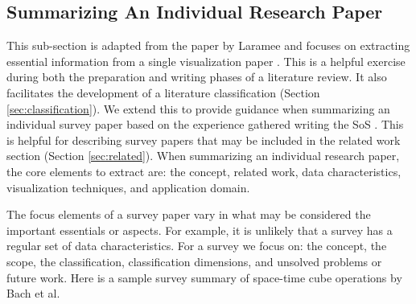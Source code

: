 \subsection{Summarizing An Individual Research Paper} \label{sec:summary}
This sub-section is adapted from the paper by Laramee and focuses on extracting essential information from a single visualization paper \cite{laramee2011read}. This is a helpful exercise during both the preparation and writing phases of a literature review. It also facilitates the development of a literature classification (Section \ref{sec:classification}). We extend this to provide guidance when summarizing an individual survey paper based on the experience gathered writing the SoS \cite{mcnabb2017sos}. This is helpful for describing survey papers  that may be included in the related work section (Section \ref{sec:related}). When summarizing an individual research paper, the core elements to extract are: the concept, related work, data characteristics, visualization techniques, and application domain. 

The focus elements of a survey paper vary in what may be considered the important essentials or aspects. For example, it is unlikely that a survey has a regular set of data characteristics. For a survey we focus on: the concept, the scope, the classification, classification dimensions, and unsolved problems or future work. Here is a sample survey summary of space-time cube operations by Bach et al.\ \cite{bach2014review} 

